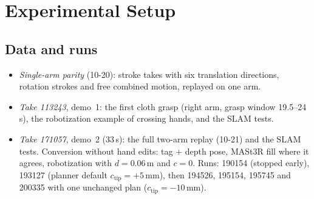 \documentclass[conference,10pt]{IEEEtran}
\newcommand{\mm}{\,mm\xspace}
\begin{document}
\section{Experimental Setup}\label{sec:setup}
\subsection{Data and runs}\label{sec:data}
\begin{itemize}
\item \emph{Single-arm parity} (10-20): stroke takes with six translation directions, rotation strokes and free combined
  motion, replayed on one arm.
\item \emph{Take 113243}, demo~1: the first cloth grasp (right arm, grasp window 19.5--24\,s), the robotization example of
  crossing hands, and the SLAM tests.
\item \emph{Take 171057}, demo~2 (33\,s): the full two-arm replay (10-21) and the SLAM tests. Conversion without hand
  edits: tag + depth pose, MASt3R fill where it agrees, robotization with $d=0.06$\,m and $c=0$. Runs: 190154 (stopped
  early), 193127 (planner default $c_\mathrm{tip}=+5$\mm), then 194526, 195154, 195745 and 200335 with one unchanged plan
  ($c_\mathrm{tip}=-10$\mm).
\end{itemize}
\end{document}
